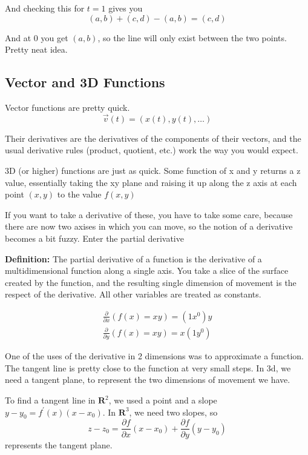 \documentclass[12pt, letterpaper]{article}
\begin{document}
And checking this for $t = 1$ gives you 
\begin{displaymath}
    (a, b) + (c, d) - (a, b) = (c, d)
\end{displaymath}

And at 0 you get $(a, b)$, so the line will only exist between the two points. Pretty neat idea.

\subsection{Vector and 3D Functions}

Vector functions are pretty quick.
\begin{displaymath}
    \vec{v}(t) = (x(t), y(t), \dots)
\end{displaymath}

Their derivatives are the derivatives of the components of their vectors, and the usual derivative rules (product, quotient, etc.) work the way you would expect.

3D (or higher) functions are just as quick. Some function of x and y returns a z value, essentially taking the xy plane and raising it up along the z axis at each point $(x, y)$ to the value $f(x, y)$

If you want to take a derivative of these, you have to take some care, because there are now two axises in which you can move, so the notion of a derivative becomes a bit fuzzy. Enter the partial derivative

\textbf{Definition:} The partial derivative of a function is the derivative of a multidimensional function along a single axis. You take a slice of the surface created by the function, and the resulting single dimension of movement is the respect of the derivative. All other variables are treated as constants.

\begin{gather*}
    \frac{\partial}{\partial x}(f(x) = xy) = (1x^0)y \\
    \frac{\partial}{\partial y}(f(x) = xy) = x(1y^0)
\end{gather*}

One of the uses of the derivative in 2 dimensions was to approximate a function. The tangent line is pretty close to the function at very small steps. In 3d, we need a tangent plane, to represent the two dimensions of movement we have.

To find a tangent line in $\textbf{R}^2$, we used a point and a slope $y - y_0 = f^\prime (x)(x-x_0)$. In $\textbf{R}^3$, we need two slopes, so 
\begin{displaymath}
    z - z_0 = \frac{\partial f}{\partial x}(x - x_0) + \frac{\partial f}{\partial y}(y - y_0)
\end{displaymath}
represents the tangent plane.
\end{document}
